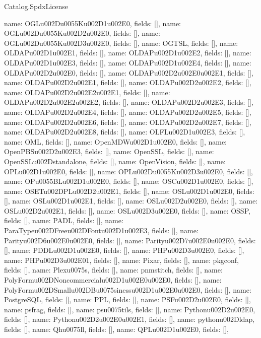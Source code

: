 \begin{lexlean}{Catalog.SpdxLicense}
\begin{semanticmodule}
{    {name: OGLu002Du0055Ku002D1u002E0, fields: []},
    {name: OGLu002Du0055Ku002D2u002E0, fields: []},
    {name: OGLu002Du0055Ku002D3u002E0, fields: []},
    {name: OGTSL, fields: []},
    {name: OLDAPu002D1u002E1, fields: []},
    {name: OLDAPu002D1u002E2, fields: []},
    {name: OLDAPu002D1u002E3, fields: []},
    {name: OLDAPu002D1u002E4, fields: []},
    {name: OLDAPu002D2u002E0, fields: []},
    {name: OLDAPu002D2u002E0u002E1, fields: []},
    {name: OLDAPu002D2u002E1, fields: []},
    {name: OLDAPu002D2u002E2, fields: []},
    {name: OLDAPu002D2u002E2u002E1, fields: []},
    {name: OLDAPu002D2u002E2u002E2, fields: []},
    {name: OLDAPu002D2u002E3, fields: []},
    {name: OLDAPu002D2u002E4, fields: []},
    {name: OLDAPu002D2u002E5, fields: []},
    {name: OLDAPu002D2u002E6, fields: []},
    {name: OLDAPu002D2u002E7, fields: []},
    {name: OLDAPu002D2u002E8, fields: []},
    {name: OLFLu002D1u002E3, fields: []},
    {name: OML, fields: []},
    {name: OpenMDWu002D1u002E0, fields: []},
    {name: OpenPBSu002D2u002E3, fields: []},
    {name: OpenSSL, fields: []},
    {name: OpenSSLu002Dstandalone, fields: []},
    {name: OpenVision, fields: []},
    {name: OPLu002D1u002E0, fields: []},
    {name: OPLu002Du0055Ku002D3u002E0, fields: []},
    {name: OPu0055BLu002D1u002E0, fields: []},
    {name: OSCu002D1u002E0, fields: []},
    {name: OSETu002DPLu002D2u002E1, fields: []},
    {name: OSLu002D1u002E0, fields: []},
    {name: OSLu002D1u002E1, fields: []},
    {name: OSLu002D2u002E0, fields: []},
    {name: OSLu002D2u002E1, fields: []},
    {name: OSLu002D3u002E0, fields: []},
    {name: OSSP, fields: []},
    {name: PADL, fields: []},
    {name: ParaTypeu002DFreeu002DFontu002D1u002E3, fields: []},
    {name: Parityu002D6u002E0u002E0, fields: []},
    {name: Parityu002D7u002E0u002E0, fields: []},
    {name: PDDLu002D1u002E0, fields: []},
    {name: PHPu002D3u002E0, fields: []},
    {name: PHPu002D3u002E01, fields: []},
    {name: Pixar, fields: []},
    {name: pkgconf, fields: []},
    {name: Plexu0075s, fields: []},
    {name: pnmstitch, fields: []},
    {name: PolyFormu002DNoncommercialu002D1u002E0u002E0, fields: []},
    {name: PolyFormu002DSmallu002DBu0075sinessu002D1u002E0u002E0, fields: []},
    {name: PostgreSQL, fields: []},
    {name: PPL, fields: []},
    {name: PSFu002D2u002E0, fields: []},
    {name: psfrag, fields: []},
    {name: psu0075tils, fields: []},
    {name: Pythonu002D2u002E0, fields: []},
    {name: Pythonu002D2u002E0u002E1, fields: []},
    {name: pythonu002Dldap, fields: []},
    {name: Qhu0075ll, fields: []},
    {name: QPLu002D1u002E0, fields: []},
}
\end{semanticmodule}
\end{lexlean}
